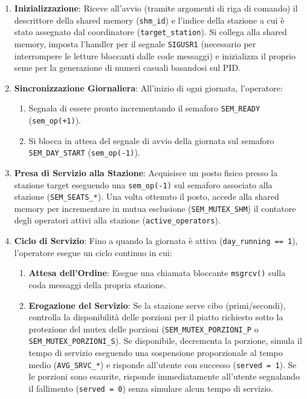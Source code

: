 \documentclass[a4paper,12pt]{article}
\begin{document}
\begin{enumerate}
  \item \textbf{Inizializzazione}: Riceve all'avvio (tramite argomenti di riga di comando) il descrittore della shared memory (\texttt{shm\_id}) e l'indice della stazione a cui è stato assegnato dal coordinatore (\texttt{target\_station}). Si collega alla shared memory, imposta l'handler per il segnale \texttt{SIGUSR1} (necessario per interrompere le letture bloccanti dalle code messaggi) e inizializza il proprio seme per la generazione di numeri casuali basandosi sul PID.
  \item \textbf{Sincronizzazione Giornaliera}: All'inizio di ogni giornata, l'operatore:
    \begin{enumerate}[label=\alph*)]
      \item Segnala di essere pronto incrementando il semaforo \texttt{SEM\_READY} (\texttt{sem\_op(+1)}).
      \item Si blocca in attesa del segnale di avvio della giornata sul semaforo \texttt{SEM\_DAY\_START} (\texttt{sem\_op(-1)}).
    \end{enumerate}
  \item \textbf{Presa di Servizio alla Stazione}: Acquisisce un posto fisico presso la stazione target eseguendo una \texttt{sem\_op(-1)} sul semaforo associato alla stazione (\texttt{SEM\_SEATS\_*}). Una volta ottenuto il posto, accede alla shared memory per incrementare in mutua esclusione (\texttt{SEM\_MUTEX\_SHM}) il contatore degli operatori attivi alla stazione (\texttt{active\_operators}).
  \item \textbf{Ciclo di Servizio}: Fino a quando la giornata è attiva (\texttt{day\_running == 1}), l'operatore esegue un ciclo continuo in cui:
    \begin{enumerate}[label=\alph*)]
      \item \textbf{Attesa dell'Ordine}: Esegue una chiamata bloccante \texttt{msgrcv()} sulla coda messaggi della propria stazione.
      \item \textbf{Erogazione del Servizio}: Se la stazione serve cibo (primi/secondi), controlla la disponibilità delle porzioni per il piatto richiesto sotto la protezione del mutex delle porzioni (\texttt{SEM\_MUTEX\_PORZIONI\_P} o \texttt{SEM\_MUTEX\_PORZIONI\_S}). Se disponibile, decrementa la porzione, simula il tempo di servizio eseguendo una sospensione proporzionale al tempo medio (\texttt{AVG\_SRVC\_*}) e risponde all'utente con successo (\texttt{served = 1}). Se le porzioni sono esaurite, risponde immediatamente all'utente segnalando il fallimento (\texttt{served = 0}) senza simulare alcun tempo di servizio.

\end{enumerate}
\end{enumerate}
\end{document}
